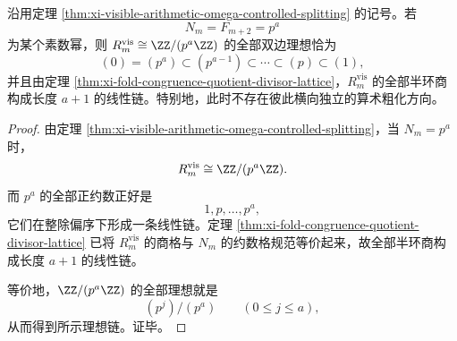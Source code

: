 \begin{corollary}[素数幂分辨率上的商格单链化]\label{cor:xi-visible-arithmetic-primepower-quotient-chain}
沿用定理 \ref{thm:xi-visible-arithmetic-omega-controlled-splitting} 的记号。若
\[
N_m=F_{m+2}=p^a
\]
为某个素数幂，则 \(R_m^{\mathrm{vis}}\cong \ZZ/(p^a\ZZ)\) 的全部双边理想恰为
\[
(0)=(p^a)\subset (p^{a-1})\subset \cdots \subset (p)\subset (1),
\]
并且由定理 \ref{thm:xi-fold-congruence-quotient-divisor-lattice}，\(R_m^{\mathrm{vis}}\) 的全部半环商构成长度 \(a+1\) 的线性链。特别地，此时不存在彼此横向独立的算术粗化方向。
\end{corollary}
\begin{proof}
由定理 \ref{thm:xi-visible-arithmetic-omega-controlled-splitting}，当 \(N_m=p^a\) 时，
\[
R_m^{\mathrm{vis}}\cong \ZZ/(p^a\ZZ).
\]
而 \(p^a\) 的全部正约数正好是
\[
1,p,\dots,p^a,
\]
它们在整除偏序下形成一条线性链。定理 \ref{thm:xi-fold-congruence-quotient-divisor-lattice} 已将 \(R_m^{\mathrm{vis}}\) 的商格与 \(N_m\) 的约数格规范等价起来，故全部半环商构成长度 \(a+1\) 的线性链。

等价地，\(\ZZ/(p^a\ZZ)\) 的全部理想就是
\[
(p^j)/(p^a)
\qquad
(0\le j\le a),
\]
从而得到所示理想链。证毕。
\end{proof}























\endinput
